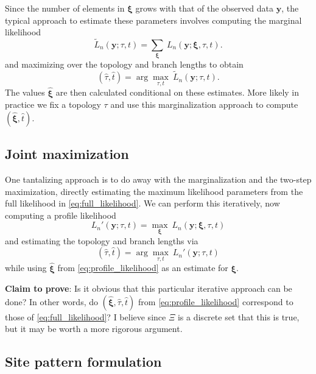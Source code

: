 \documentclass[a4paper]{article}
\begin{document}
Since the number of elements in $\boldsymbol\xi$ grows with that of the observed data $\mathbf{y}$, the typical approach to estimate these parameters involves computing the marginal likelihood
\begin{equation}
\label{eq:marginal_likelihood}
\tilde{L}_n(\mathbf{y}; \tau, t) = \sum_{\boldsymbol\xi} \ L_n(\mathbf{y};\boldsymbol\xi, \tau, t).
\end{equation}
and maximizing over the topology and branch lengths to obtain
$$
(\hat{\tau}, \hat{t}) = \arg\max_{\tau, t} \  \tilde{L}_n(\mathbf{y}; \tau, t).
$$
The values $\hat{\boldsymbol\xi}$ are then calculated conditional on these estimates.
More likely in practice we fix a topology $\tau$ and use this marginalization approach to compute $(\hat{\boldsymbol\xi}, \hat{t})$.

\subsection{Joint maximization}

One tantalizing approach is to do away with the marginalization and the two-step maximization, directly estimating the maximum likelihood parameters from the full likelihood in \eqref{eq:full_likelihood}.
We can perform this iteratively, now computing a profile likelihood
\begin{equation}
\label{eq:profile_likelihood}
L_n'(\mathbf{y};\tau, t) = \max_{\boldsymbol\xi} \ L_n(\mathbf{y};\boldsymbol\xi, \tau, t)
\end{equation}
and estimating the topology and branch lengths via
$$
(\hat{\tau}, \hat{t}) = \arg\max_{\tau, t} \ L_n'(\mathbf{y};\tau, t)
$$
while using $\hat{\boldsymbol\xi}$ from \eqref{eq:profile_likelihood} as an estimate for $\boldsymbol\xi$.

\textbf{Claim to prove}: Is it obvious that this particular iterative approach can be done? In other words, do $(\hat{\boldsymbol\xi}, \hat{\tau}, \hat{t})$ from \eqref{eq:profile_likelihood} correspond to those of \eqref{eq:full_likelihood}? I believe since $\Xi$ is a discrete set that this is true, but it may be worth a more rigorous argument.

\subsection{Site pattern formulation}
\end{document}
